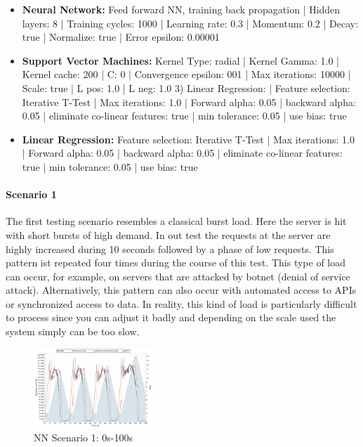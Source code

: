 \begin{itemize}
\item \textbf{Neural Network:} Feed forward NN, training back propagation | Hidden layers: 8 | Training cycles: 1000 | Learning rate: 0.3 | Momentum: 0.2 | Decay: true | Normalize: true | Error epsilon: 0.00001
\item \textbf{Support Vector Machines:} Kernel Type: radial | Kernel Gamma: 1.0 | Kernel cache: 200 | C: 0 | Convergence epsilon: 001 | Max iterations: 10000 | Scale: true | L pos: 1.0 | L neg: 1.0 3) Linear Regression: | Feature selection: Iterative T-Test | Max iterations: 1.0 | Forward alpha: 0.05 | backward alpha: 0.05 | eliminate co-linear features: true | min tolerance: 0.05 | use bias: true 
\item \textbf{Linear Regression:} Feature selection: Iterative T-Test | Max iterations: 1.0 | Forward alpha: 0.05 | backward alpha: 0.05 | eliminate co-linear features: true | min tolerance: 0.05 | use bias: true 
\end{itemize}


\paragraph*{Scenario 1}
The first testing scenario resembles a classical burst load. Here the server is hit with short bursts of high demand. In out test the requests at the server are highly increased during 10 seconds followed by a phase of low requests. This pattern ist repeated four times during the course of this test. This type of load can occur, for example, on servers that are attacked by botnet (denial of service attack). Alternatively, this pattern can also occur with automated access to APIs or synchronized access to data. In reality, this kind of load is particularly difficult to process since you can adjust it badly and depending on the scale used the system simply can be too slow.

\begin{figure}[ht]
	\begin{center}
		\includegraphics[width=0.40\textwidth]{chapters/chapter5/fig/NN1_1}
	\end{center}
	\caption{NN Scenario 1: 0s-100s}
	\label{fig:NN1_1}
\end{figure}

